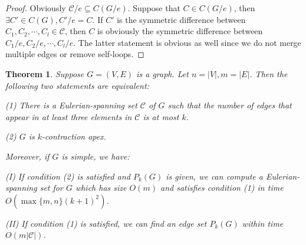 \documentclass[10pt,fleqn]{article}
\newtheorem{theorem}{Theorem}[section]
\newcommand{\mc}[1]{\mathcal{#1}}
\begin{document}
	\begin{proof}
		Obviously $\mc{C}/ e\subseteq C(G/ e)$. Suppose that $C\in C(G/ e)$, then $\exists C'\in C(G), C'/ e=C$. If $C'$ is the symmetric difference between $C_1,C_2,\cdots,C_l\in\mc{C}$, then $C$ is obviously the symmetric difference between $C_1/ e,C_2/ e,\cdots,C_l/ e$. The latter statement is obvious as well since we do not merge multiple edges or remove self-loops.
	\end{proof}
	\begin{theorem}\label{thm61}
		Suppose $G=(V,E)$ is a graph. Let $n=|V|,m=|E|$. Then the following two statements are equivalent:\par
		(1) There is a Eulerian-spanning set $\mc{C}$ of $G$ such that the number of edges that appear in at least three elements in $\mc{C}$ is at most $k$.\par
		(2) $G$ is $k$-contraction apex. \par
		Moreover, if $G$ is simple, we have: \par
		(I) If condition (2) is satisfied and $P_k(G)$ is given, we can compute a Eulerian-spanning set for $G$ which has size $O(m)$ and satisfies condition (1) in time $O(\max\{m,n\}(k+1)^2)$. \par
		(II) If condition (1) is satisfied, we can find an edge set $P_k(G)$ within time $O(m|\mc{C}|)$.
	\end{theorem}
\end{document}
